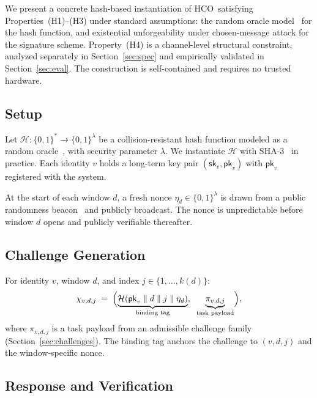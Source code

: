 \documentclass[11pt]{article}
\newcommand{\HCO}{HCO\xspace}
\theoremstyle{remark}
\theoremstyle{plain}
\begin{document}
	We present a concrete hash-based instantiation of \HCO\ satisfying
	Properties~(H1)--(H3) under standard assumptions: the random oracle
	model~\cite{bellare1993random} for the hash function, and existential
	unforgeability under chosen-message attack for the signature scheme.
	Property~(H4) is a channel-level structural constraint, analyzed
	separately in Section~\ref{sec:spec} and empirically validated
	in Section~\ref{sec:eval}. The construction is self-contained and
	requires no trusted hardware.
	
	\subsection{Setup}
	
	Let $\mathcal{H}: \{0,1\}^* \to \{0,1\}^\lambda$ be a collision-resistant
	hash function modeled as a random oracle~\cite{bellare1993random}, with
	security parameter $\lambda$. We instantiate $\mathcal{H}$ with
	SHA-3~\cite{nist2015sha3} in practice. Each identity $v$ holds a
	long-term key pair $(\mathsf{sk}_v, \mathsf{pk}_v)$ with $\mathsf{pk}_v$
	registered with the system.
	
	At the start of each window $d$, a fresh nonce
	$\eta_d \in \{0,1\}^\lambda$ is drawn from a public randomness
	beacon~\cite{syta2017drand} and publicly broadcast. The nonce is
	unpredictable before window $d$ opens and publicly verifiable thereafter.
	
	\subsection{Challenge Generation}
	
	For identity $v$, window $d$, and index $j \in \{1,\ldots,k(d)\}$:
	\begin{equation}
		\chi_{v,d,j}
		\;=\;
		\Bigl(
		\underbrace{\mathcal{H}(\mathsf{pk}_v \;\|\; d \;\|\; j \;\|\; \eta_d)}_{\text{binding tag}},
		\;\;
		\underbrace{\pi_{v,d,j}}_{\text{task payload}}
		\Bigr),
		\label{eq:challenge-gen}
	\end{equation}
	where $\pi_{v,d,j}$ is a task payload from an admissible challenge
	family (Section~\ref{sec:challenges}). The binding tag anchors the
	challenge to $(v,d,j)$ and the window-specific nonce.
	
	\subsection{Response and Verification}
	
\end{document}

